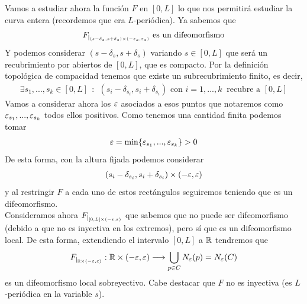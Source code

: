 Vamos a estudiar ahora la función $F$ en $[0,L]$ lo que nos permitirá estudiar la curva entera (recordemos que era $L$-periódica). Ya sabemos que 
\begin{gather*}
    F_{|_{(s-\delta_s, s+\delta_s) \times (-\varepsilon_s, \varepsilon_s)}} \text{ es un difeomorfismo}
\end{gather*}
Y podemos considerar $(s-\delta_s, s+\delta_s)$ variando $s\in [0,L]$ que será un recubrimiento por abiertos de $[0,L]$, que es compacto. Por la definición topológica de compacidad tenemos que existe un subrecubrimiento finito, es decir,
\begin{gather*}
    \exists s_1,...,s_k\in [0,L] \ \ : \ \ (s_i - \delta_{s_i}, s_i + \delta_{s_i}) \text{ con } i=1,...,k \ \text{ recubre a } [0,L]
\end{gather*}
Vamos a considerar ahora los $\varepsilon$ asociados a esos puntos que notaremos como $\varepsilon_{s_1}, ..., \varepsilon_{s_k}$ todos ellos positivos. Como tenemos una cantidad finita podemos tomar
\begin{gather*}
    \varepsilon = \min\{\varepsilon_{s_1}, ..., \varepsilon_{s_k}\} > 0
\end{gather*}
De esta forma, con la altura fijada podemos considerar
\begin{gather*}
    (s_i - \delta_{s_i}, s_i + \delta_{s_i})\times(-\varepsilon, \varepsilon)
\end{gather*}
y al restringir $F$ a cada uno de estos rectángulos seguiremos teniendo que es un difeomorfismo.\\

Consideramos ahora $F_{|_{[0,L]\times(-\varepsilon, \varepsilon)}}$ que sabemos que no puede ser difeomorfismo (debido a que no es inyectiva en los extremos), pero sí que es un difeomorfismo local.
De esta forma, extendiendo el intervalo $[0,L]$ a $\mathbb{R}$ tendremos que
\begin{gather*}
    F_{|_{\mathbb{R}\times(-\varepsilon, \varepsilon)}} : \mathbb{R}\times(-\varepsilon, \varepsilon) \longrightarrow \bigcup_{p\in C} N_\varepsilon(p) = N_\varepsilon(C)
\end{gather*}
es un difeomorfismo local sobreyectivo. Cabe destacar que $F$ no es inyectiva (es $L$-periódica en la variable $s$).

